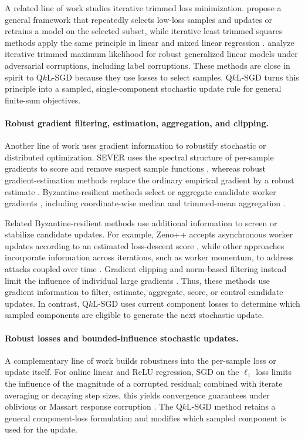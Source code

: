 \documentclass[11pt]{article}
\begin{document}
A related line of work studies iterative trimmed loss minimization.
\citet{shen2019learning} propose a general framework that repeatedly selects
low-loss samples and updates or retrains a model on the selected subset, while
iterative least trimmed squares methods apply the same principle in linear and
mixed linear regression \citep{shen2019iterative}.
\citet{awasthi2022trimmed} analyze iterative trimmed maximum likelihood for
robust generalized linear models under adversarial corruptions, including label
corruptions. These methods are close in spirit to Q\(k\)L-SGD because they use
losses to select samples. Q\(k\)L-SGD turns this principle into a sampled,
single-component stochastic update rule for general finite-sum objectives.


\paragraph{Robust gradient filtering, estimation, aggregation, and clipping.}
Another line of work uses gradient information to robustify stochastic or
distributed optimization. SEVER uses the spectral structure of per-sample
gradients to score and remove suspect sample functions
\citep{diakonikolas2019sever}, whereas robust gradient-estimation methods
replace the ordinary empirical gradient by a robust estimate
\citep{prasad2020robust}. Byzantine-resilient methods select or aggregate
candidate worker gradients
\citep{blanchard2017machine,alistarh2018byzantine}, including
coordinate-wise median and trimmed-mean aggregation
\citep{yin2018byzantine}.

Related Byzantine-resilient methods use additional information to screen or
stabilize candidate updates. For example, Zeno++ accepts asynchronous worker
updates according to an estimated loss-descent score
\citep{xie2020zeno++}, while other approaches incorporate information across
iterations, such as worker momentum, to address attacks coupled over time
\citep{karimireddy2021learning}. Gradient clipping and norm-based filtering
instead limit the influence of individual large gradients
\citep{gorbunov2020stochastic,gupta2021byzantine}. Thus, these methods use
gradient information to filter, estimate, aggregate, score, or control
candidate updates. In contrast, Q\(k\)L-SGD uses current component losses to
determine which sampled components are eligible to generate the next
stochastic update.


\paragraph{Robust losses and bounded-influence stochastic updates.}
A complementary line of work builds robustness into the per-sample loss or
update itself.
For online linear and ReLU regression, SGD on the \(\ell_1\) loss limits the
influence of the magnitude of a corrupted residual; combined with iterate
averaging or decaying step sizes, this yields convergence guarantees under
oblivious or Massart response corruption
\citep{pesme2020online,jeong2025stochastic}. The Q\(k\)L-SGD method retains
a general component-loss formulation and modifies which sampled component is
used for the update.
\end{document}
